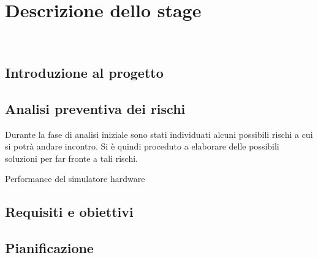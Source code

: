 
\chapter{Descrizione dello stage}
\label{cap:descrizione-stage}

\\

\section{Introduzione al progetto}

\section{Analisi preventiva dei rischi}

Durante la fase di analisi iniziale sono stati individuati alcuni possibili rischi a cui si potrà andare incontro.
Si è quindi proceduto a elaborare delle possibili soluzioni per far fronte a tali rischi.\\

\begin{risk}{Performance del simulatore hardware}
    \label{risk:hardware-simulator} 
\end{risk}

\section{Requisiti e obiettivi}


\section{Pianificazione}

